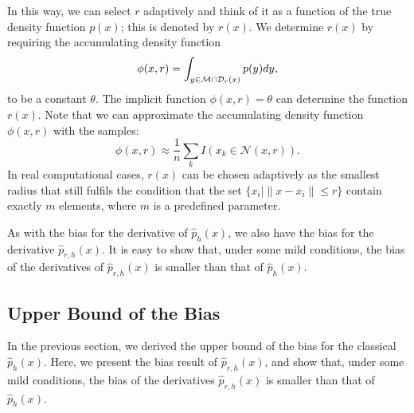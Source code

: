 \documentclass[aos,preprint]{imsart}
\theoremstyle{remark}
\begin{document}
In this way, we can select $r$ adaptively and think of it as a function of the true density function $p(x)$; this is denoted by $r(x)$. We determine $r(x)$ by requiring the accumulating density function 
\[
\phi(x,r) = \int_{y\in {\cal M}\cap {\mathcal D}_r(x)} p(y) dy,
\] 
to be a constant $\theta$. %
The implicit function $\phi(x,r)=\theta$ can determine the function $r(x)$.
Note that we can approximate the accumulating density function $\phi(x,r)$ with the samples:
\[
\phi(x,r) \approx \frac{1}{n} \sum_k I(x_k\in {\mathcal N}(x,r)).
\]
In real computational cases, $r(x)$ can be chosen adaptively as the smallest radius that still fulfils the condition that the set $\{x_i | \|x-x_i\|\leq r\}$ contain exactly $m$ elements, where $m$ is a predefined parameter.

As with the bias for the derivative of $\hat{p}_h(x)$, we also have the bias for the derivative $\hat{p}_{r,h}(x)$. It is easy to show that, under some mild conditions, the bias of the derivatives of $\hat{p}_{r,h}(x)$ is smaller than that of $\hat{p}_h(x)$.
\subsection{Upper Bound of the Bias}
In the previous section, we derived the upper bound of the bias for the classical $\hat{p}_h(x)$. Here, we present the bias result of $\hat{p}_{r,h}(x)$, and show that, under some mild conditions, the bias of the derivatives $\hat{p}_{r,h}(x)$ is smaller than that of $\hat{p}_h(x)$.
\end{document}
